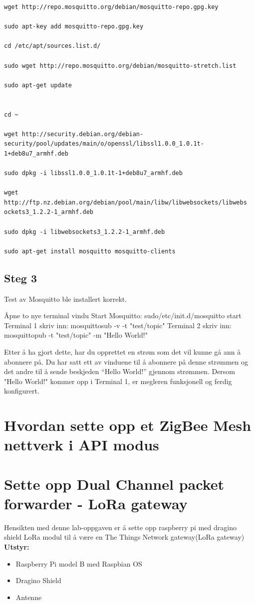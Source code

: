 \documentclass{article}
\begin{document}
\begin{appendices}
\begin{verbatim}
wget http://repo.mosquitto.org/debian/mosquitto-repo.gpg.key

sudo apt-key add mosquitto-repo.gpg.key

cd /etc/apt/sources.list.d/

sudo wget http://repo.mosquitto.org/debian/mosquitto-stretch.list

sudo apt-get update


cd ~

wget http://security.debian.org/debian-security/pool/updates/main/o/openssl/libssl1.0.0_1.0.1t-1+deb8u7_armhf.deb

sudo dpkg -i libssl1.0.0_1.0.1t-1+deb8u7_armhf.deb

wget http://ftp.nz.debian.org/debian/pool/main/libw/libwebsockets/libwebs
ockets3_1.2.2-1_armhf.deb

sudo dpkg -i libwebsockets3_1.2.2-1_armhf.deb

sudo apt-get install mosquitto mosquitto-clients
\end{verbatim}


\subsection{Steg 3}
Test av Mosquitto ble installert korrekt.

Åpne to nye terminal vindu
Start Mosquitto: sudo/etc/init.d/mosquitto start
Terminal 1 skriv inn: mosquitto\textunderscore sub -v -t "test/topic"
Terminal 2 skriv inn: mosquitto\textunderscore pub -t "test/topic" -m "Hello World!"

Etter å ha gjort dette, har du opprettet en strøm som det vil kunne gå ann å abonnere på. Du har satt ett av vinduene til å abonnere på denne strømmen og det andre til å sende beskjeden “Hello World!” gjennom strømmen. Dersom "Hello World!" kommer opp i Terminal 1, er megleren funksjonell og ferdig konfigurert.

\newpage 
\section{Hvordan sette opp et ZigBee Mesh nettverk i API modus}

\newpage 
\section{Sette opp Dual Channel packet forwarder - LoRa gateway}
Hensikten med denne lab-oppgaven er å sette opp raspberry pi med dragino shield LoRa modul til å være en The Things Network gateway(LoRa gateway)
\\
\textbf{Utstyr:}
\begin{itemize}
	\item Raspberry Pi model B med Raspbian OS
	\item Dragino Shield 
	\item Antenne
\end{itemize}



\end{appendices}
\end{document}
